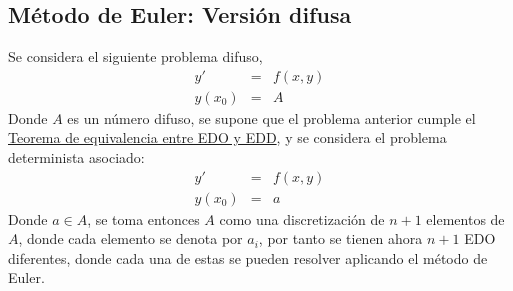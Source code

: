 \subsection{Método de Euler: Versión difusa}
Se considera el siguiente problema difuso,
\[
	\begin{array}{ccc}
		y' & = &f(x, y)  \\
		y(x_0) & = & A
	\end{array}
\]
Donde $A$ es un número difuso, se supone que el problema anterior cumple el \hyperref[teorema:equivalencia]{Teorema de equivalencia entre EDO y EDD}, y se considera el problema determinista asociado:
\[
	\begin{array}{ccc}
		y' & = &f(x, y)  \\
		y(x_0) & = & a
	\end{array}
\]
Donde $a \in A$, se toma entonces $A$ como una discretización de $n+1$ elementos de $A$, donde cada elemento se denota por $a_i$, por tanto se tienen ahora $n+1$ EDO diferentes, donde cada una de estas se pueden resolver aplicando el método de Euler.
